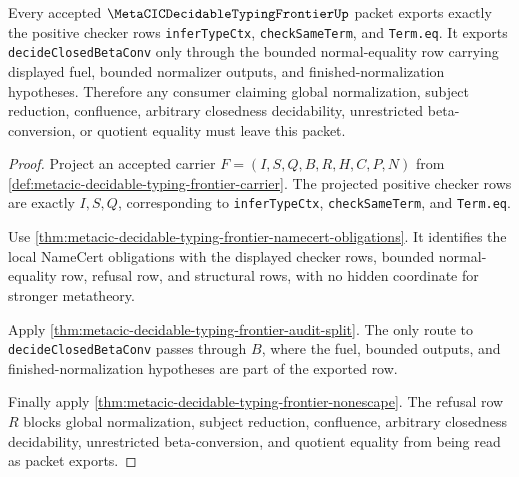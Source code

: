 \begin{theorem}
\label{thm:metacic-decidable-typing-coverage-frontier}
Every accepted $\MetaCICDecidableTypingFrontierUp$ packet exports exactly the positive checker rows \texttt{inferTypeCtx}, \texttt{checkSameTerm}, and \texttt{Term.eq}. It exports \texttt{decideClosedBetaConv} only through the bounded normal-equality row carrying displayed fuel, bounded normalizer outputs, and finished-normalization hypotheses. Therefore any consumer claiming global normalization, subject reduction, confluence, arbitrary closedness decidability, unrestricted beta-conversion, or quotient equality must leave this packet.
\end{theorem}
\begin{proof}
Project an accepted carrier $F=(I,S,Q,B,R,H,C,P,N)$ from \autoref{def:metacic-decidable-typing-frontier-carrier}. The projected positive checker rows are exactly $I,S,Q$, corresponding to \texttt{inferTypeCtx}, \texttt{checkSameTerm}, and \texttt{Term.eq}.

Use \autoref{thm:metacic-decidable-typing-frontier-namecert-obligations}. It identifies the local NameCert obligations with the displayed checker rows, bounded normal-equality row, refusal row, and structural rows, with no hidden coordinate for stronger metatheory.

Apply \autoref{thm:metacic-decidable-typing-frontier-audit-split}. The only route to \texttt{decideClosedBetaConv} passes through $B$, where the fuel, bounded outputs, and finished-normalization hypotheses are part of the exported row.

Finally apply \autoref{thm:metacic-decidable-typing-frontier-nonescape}. The refusal row $R$ blocks global normalization, subject reduction, confluence, arbitrary closedness decidability, unrestricted beta-conversion, and quotient equality from being read as packet exports.
\end{proof}


